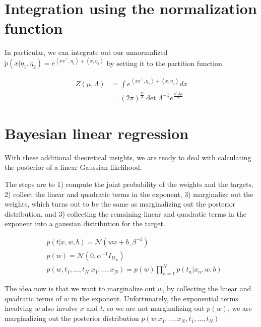 \documentclass[a4paper]{article}
\begin{document}
\section{Integration using the normalization function}

In particular, we can integrate out our unnormalized $ \tilde{p}(x \vert \eta_1,\eta_2) = e^{ \left< x x^\intercal, \eta_1 \right> + \left< x, \eta_2 \right> } $ by setting it to the partition function

\begin{equation}
  \begin{split}
    Z(\mu,\Lambda) &= 
      \int 
        e^{ 
  	\left< x x^\intercal, \eta_1 \right> + \left< x, \eta_2 \right> 
        } 
      dx \\
      &= \left( 2 \pi \right) ^ { \frac{D}{2} }
      \det \Lambda ^{ -\frac{1}{2} }
      e^{ 
        \frac{ \mu^\intercal \Lambda \mu }{ 2 } 
      }
    \end{split}
  \label{Gaussian normalization function}
\end{equation}

\section{Bayesian linear regression}

With these additional theoretical insights, we are ready to deal with calculating the posterior of a linear Gaussian likelihood.

The steps are to 1) compute the joint probability of the weights and the targets, 2) collect the linear and quadratic terms in the exponent, 3) marginalize out the weights, which turns out to be the same as marginalizing out the posterior distribution, and 3) collecting the remaining linear and quadratic terms in the exponent into a gaussian distribution for the target.

\begin{equation}
  \begin{split}
    &p( t \vert x, w, b ) = \mathcal{N} \left( w x + b, \beta^{-1} \right) \\
    &p( w ) = \mathcal{N} \left( 0, \alpha^{-1} I_{D_w} \right) \\
    &p( w, t_1, \ldots, t_N \vert x_1, \ldots, x_N ) = p(w) \prod_{n=1}^N p( t_n \vert x_n, w, b)
  \end{split}
  \label{}
\end{equation}

The idea now is that we want to marginalize out $w$, by collecting the linear and quadratic terms of $w$ in the exponent. 
Unfortunately, the exponential terms involving $w$ also involve $x$ and $t$, so we are not marginalizing out $p(w)$, we are marginalizing out the posterior distribution $p(w \vert x_1,\ldots,x_N,t_1,\ldots,t_N)$
\end{document}
